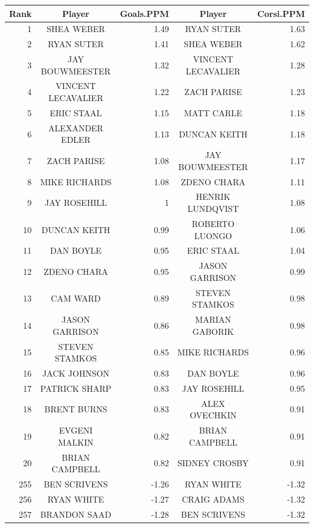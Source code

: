 \begin{table}[p]
    \centering\small
    \begin{tabular}{r c r | c r  }
        Rank & Player & Goals.PPM  & Player & Corsi.PPM  \\ 
        \hline\rule{0pt}{4ex} 
        1     & SHEA WEBER & 1.49  & RYAN SUTER & 1.63 \\
        2     & RYAN SUTER & 1.41  & SHEA WEBER & 1.62 \\
        3     & JAY BOUWMEESTER & 1.32  & VINCENT LECAVALIER & 1.28 \\
        4     & VINCENT LECAVALIER & 1.22  & ZACH PARISE & 1.23 \\
        5     & ERIC STAAL & 1.15  & MATT CARLE & 1.18 \\
        6     & ALEXANDER EDLER & 1.13  & DUNCAN KEITH & 1.18 \\
        7     & ZACH PARISE & 1.08  & JAY BOUWMEESTER & 1.17 \\
        8     & MIKE RICHARDS & 1.08  & ZDENO CHARA & 1.11 \\
        9     & JAY ROSEHILL & 1     & HENRIK LUNDQVIST & 1.08 \\
        10    & DUNCAN KEITH & 0.99  & ROBERTO LUONGO & 1.06 \\
        11    & DAN BOYLE & 0.95  & ERIC STAAL & 1.04 \\
        12    & ZDENO CHARA & 0.95  & JASON GARRISON & 0.99 \\
        13    & CAM WARD & 0.89  & STEVEN STAMKOS & 0.98 \\
        14    & JASON GARRISON & 0.86  & MARIAN GABORIK & 0.98 \\
        15    & STEVEN STAMKOS & 0.85  & MIKE RICHARDS & 0.96 \\
        16    & JACK JOHNSON & 0.83  & DAN BOYLE & 0.96 \\
        17    & PATRICK SHARP & 0.83  & JAY ROSEHILL & 0.95 \\
        18    & BRENT BURNS & 0.83  & ALEX OVECHKIN & 0.91 \\
        19    & EVGENI MALKIN & 0.82  & BRIAN CAMPBELL & 0.91 \\
        20    & BRIAN CAMPBELL & 0.82  & SIDNEY CROSBY & 0.91 \\
        \hline\rule{0pt}{4ex} 
        255   & BEN SCRIVENS & -1.26 & RYAN WHITE & -1.32 \\
        256   & RYAN WHITE & -1.27 & CRAIG ADAMS & -1.32 \\
        257   & BRANDON SAAD & -1.28 & BEN SCRIVENS & -1.32 \\

\end{tabular}
\end{table}

